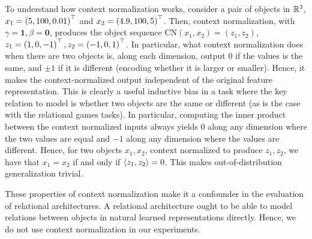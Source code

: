 To understand how context normalization works, consider a pair of objects in $\mathbb{R}^3$, $x_1 = \left(5, 100, 0.01\right)^\top$ and $x_2 = \left(4.9, 100, 5\right)^\top$. Then, context normalization, with $\gamma = \bm{1}, \beta = \bm{0}$, produces the object sequence $\mathrm{CN}(x_1, x_2) = (z_1, z_2)$, $z_1 = \left(1, 0, -1\right)^\top, z_2 = \left(-1, 0, 1\right)^\top$. In particular, what context normalization does when there are two objects is, along each dimension, output 0 if the values is the same, and $\pm 1$ if it is different (encoding whether it is larger or smaller). Hence, it makes the context-normalized output independent of the original feature representation. This is clearly a useful inductive bias in a task where the key relation to model is whether two objects are the same or different (as is the case with the relational games tasks). In particular, computing the inner product between the context normalized inputs always yields $0$ along any dimension where the two values are equal and $-1$ along any dimension where the values are different. Hence, for two objects $x_1, x_2$, context normalized to produce $z_1, z_2$, we have that $x_1 = x_2$ if and only if $\left \langle z_1, z_2 \right\rangle = 0$. This makes out-of-distribution generalization trivial.

These properties of context normalization make it a confounder in the evaluation of relational architectures. A relational architecture ought to be able to model relations between objects in natural learned representations directly. Hence, we do not use context normalization in our experiments.